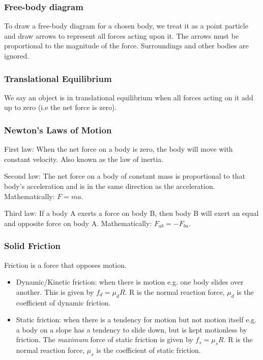 \subsubsection{Free-body diagram}
To draw a free-body diagram for a chosen body, we treat it as a point particle
and draw arrows to represent all forces acting upon it. The arrows must be
proportional to the magnitude of the force. Surroundings and other bodies are
ignored.

\subsubsection{Translational Equilibrium}
We say an object is in translational equilibrium when all forces acting on it
add up to zero (i.e the net force is zero).

\subsubsection{Newton's Laws of Motion}

First law: When the net force on a body is zero, the body will move with
constant velocity. Also known as the law of inertia.

Second law: The net force on a body of constant mass is proportional to that
body's acceleration and is in the same direction as the acceleration.
Mathematically: $F=ma$.

Third law: If a body A exerts a force on body B, then body B will exert an
equal and opposite force on body A. Mathematically: $F_{ab} = -F_{ba}$.

\subsubsection{Solid Friction}
Friction is a force that opposes motion.
\begin{itemize}
    \item Dynamic/Kinetic friction: when there is motion e.g. one body slides
        over another. This is given by $f_d = \mu_d R$. R is the normal
        reaction force, $\mu_d$ is the coefficient of dynamic friction.
    \item Static friction: when there is a tendency for motion but not motion
        itself e.g. a body on a slope has a tendency to slide down, but is kept
        motionless by friction. The \textit{maximum} force of static friction
        is given by $f_s = \mu_s R$. R is the normal reaction force, $\mu_s$ is
        the coefficient of static friction.
\end{itemize}

